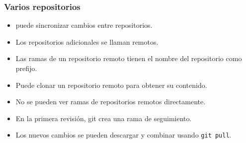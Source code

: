 \begin{frame}
	\frametitle{Varios repositorios
		📡}

	\begin{itemize}
		\item {} puede sincronizar cambios entre repositorios.
		\item Los repositorios adicionales se llaman remotos.
		\item Las ramas de un repositorio remoto tienen el nombre del
		      repositorio como prefijo.
		\item Puede clonar un repositorio remoto para obtener su contenido.
		\item No se pueden ver ramas de repositorios remotos directamente.
		\item En la primera revisión, git crea una rama de seguimiento.
		\item Los nuevos cambios se pueden descargar y combinar usando
		      \lstinline|git pull|.
	\end{itemize}
\end{frame}


